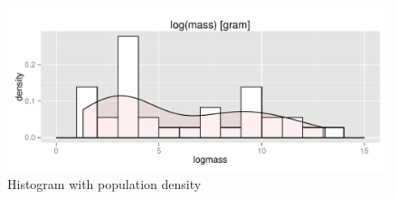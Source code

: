 \documentclass{article}\usepackage[]{graphicx}\usepackage[]{color}
\makeatletter
\def\maxwidth{ %
  \ifdim\Gin@nat@width>\linewidth
    \linewidth
  \else
    \Gin@nat@width
  \fi
}
\newenvironment{knitrout}{}{} %
\makeatother
\begin{document}
\begin{enumerate}
\begin{enumerate}
\begin{figure}[H] \begin{center}
\begin{knitrout}
\color{fgcolor}
\includegraphics[width=\maxwidth]{figure/4p_den} 

\end{knitrout}
\end{center} \vspace{-0.15in} \caption{Histogram with population density} \end{figure}

      \end{enumerate}
    \end{enumerate}
\end{document}
